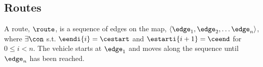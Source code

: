 \subsection{Routes}
A route, $\route$, is a sequence of edges on the map, $\langle \edge_1, \edge_2, \dots \edge_n \rangle$, where $\exists \con$ s.t. $\eendi{i} = \cestart$ and $\estarti{i+1} = \ceend$ for $0\leq i< n$.
The vehicle starts at $\edge_1$ and moves along the sequence until $\edge_n$ has been reached.

